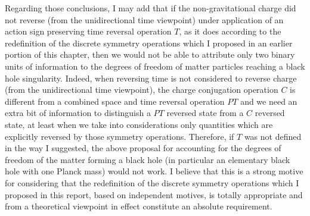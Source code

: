 \documentclass[notitlepage,12pt]{report}
\begin{document}
Regarding those conclusions, I may add that if the non-gravitational charge did not reverse (from the unidirectional time viewpoint) under application of an action sign preserving time reversal operation $T$, as it does according to the redefinition of the discrete symmetry operations which I proposed in an earlier portion of this chapter, then we would not be able to attribute only two binary units of information to the degrees of freedom of matter particles reaching a black hole singularity. Indeed, when reversing time is not considered to reverse charge (from the unidirectional time viewpoint), the charge conjugation operation $C$ is different from a combined space and time reversal operation $PT$ and we need an extra bit of information to distinguish a $PT$ reversed state from a $C$ reversed state, at least when we take into considerations only quantities which are explicitly reversed by those symmetry operations. Therefore, if $T$ was not defined in the way I suggested, the above proposal for accounting for the degrees of freedom of the matter forming a black hole (in particular an elementary black hole with one Planck mass) would not work. I believe that this is a strong motive for considering that the redefinition of the discrete symmetry operations which I proposed in this report, based on independent motives, is totally appropriate and from a theoretical viewpoint in effect constitute an absolute requirement.

\bigskip
\end{document}
